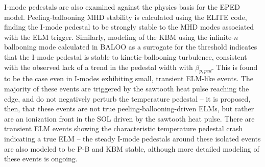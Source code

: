 I-mode pedestals are also examined against the physics basis for the EPED model.  Peeling-ballooning MHD stability is calculated using the ELITE code, finding the I-mode pedestal to be strongly stable to the MHD modes associated with the ELM trigger.  Similarly, modeling of the KBM using the infinite-$n$ ballooning mode calculated in BALOO as a surrogate for the threshold indicates that the I-mode pedestal is stable to kinetic-ballooning turbulence, consistent with the observed lack of a trend in the pedestal width with $\beta_{p,ped}$.  This is found to be the case even in I-modes exhibiting small, transient ELM-like events.  The majority of these events are triggered by the sawtooth heat pulse reaching the edge, and do not negatively perturb the temperature pedestal -- it is proposed, then, that these events are not true peeling-ballooning-driven ELMs, but rather are an ionization front in the SOL driven by the sawtooth heat pulse.  There are transient ELM events showing the characteristic temperature pedestal crash indicating a true ELM -- the steady I-mode pedestals around these isolated events are also modeled to be P-B and KBM stable, although more detailed modeling of these events is ongoing.